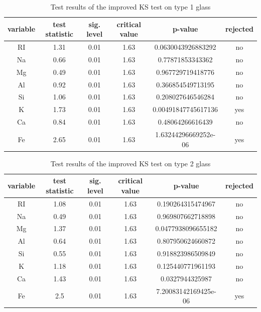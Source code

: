\documentclass[a4paper, 12pt, titlepage, headsepline, listof = totoc, bibliography = totoc, numbers = noenddot]{scrartcl}
\begin{document}
\begin{table}[h!]
\centering
\begin{tabular}{|cccccc|} \hline variable & test statistic & sig. level & critical value & p-value & rejected\\ \hline RI & 1.31 & 0.01 & 1.63 & 0.0630043926883292 & no\\ 
Na & 0.66 & 0.01 & 1.63 & 0.77871853343362 & no\\ 
Mg & 0.49 & 0.01 & 1.63 & 0.967729719418776 & no\\ 
Al & 0.92 & 0.01 & 1.63 & 0.366854549713195 & no\\ 
Si & 1.06 & 0.01 & 1.63 & 0.208027646546284 & no\\ 
K & 1.73 & 0.01 & 1.63 & 0.00491847745617136 & yes\\ 
Ca & 0.84 & 0.01 & 1.63 & 0.48064266616439 & no\\ 
Fe & 2.65 & 0.01 & 1.63 & 1.63244296669252e-06 & yes\\ \hline \end{tabular}\caption{Test results of the improved KS test on type 1 glass}
\label{tab:KS-type1}
\end{table}



\begin{table}[h!]
\centering
\begin{tabular}{|cccccc|} \hline variable & test statistic & sig. level & critical value & p-value & rejected\\ \hline RI & 1.08 & 0.01 & 1.63 & 0.190264315474967 & no\\ 
Na & 0.49 & 0.01 & 1.63 & 0.969807662718898 & no\\ 
Mg & 1.37 & 0.01 & 1.63 & 0.0477938096655182 & no\\ 
Al & 0.64 & 0.01 & 1.63 & 0.807950624660872 & no\\ 
Si & 0.55 & 0.01 & 1.63 & 0.918823986509849 & no\\ 
K & 1.18 & 0.01 & 1.63 & 0.125440771961193 & no\\ 
Ca & 1.43 & 0.01 & 1.63 & 0.0327944325987 & no\\ 
Fe & 2.5 & 0.01 & 1.63 & 7.20083142169425e-06 & yes\\ \hline \end{tabular}\caption{Test results of the improved KS test on type 2 glass}
\label{tab:KS-type2}
\end{table}
\end{document}
